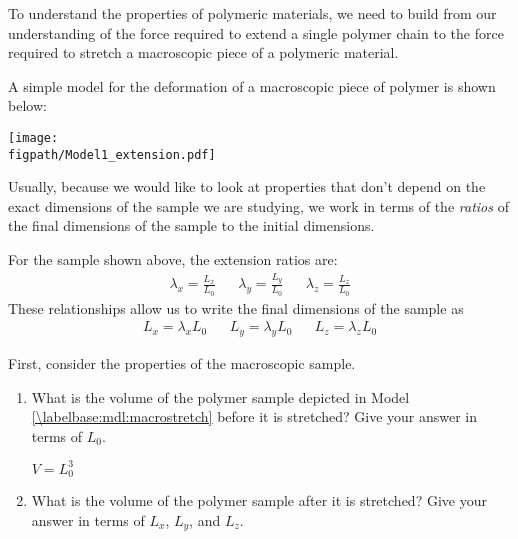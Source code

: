 \begin{activity}
\begin{instructornotes}
\end{instructornotes}


\begin{model}
	\label{\labelbase:mdl:macrostretch}

	To understand the properties of polymeric materials, we need to build from our understanding of the force required to extend a single polymer chain to the force required to stretch a macroscopic piece of a polymeric material.
	
	A simple model for the deformation of a macroscopic piece of polymer is shown below:
	
	\vspace{6pt}
	\centerline{\texttt{[image: \\figpath/Model1\_extension.pdf]}}
	
	Usually, because we would like to look at properties that don't depend on the exact dimensions of the sample we are studying, we work in terms of the \emph{ratios} of the final dimensions of the sample to the initial dimensions.
	
	For the sample shown above, the extension ratios are:
	\begin{align*}
		\lambda_x = \frac{L_x}{L_0} && \lambda_y = \frac{L_y}{L_0} && \lambda_z = \frac{L_z}{L_0}
	\end{align*}
	These relationships allow us to write the final dimensions of the sample as
	\begin{align*}
		L_x = \lambda_x L_0 && L_y = \lambda_y L_0 && L_z = \lambda_z L_0
	\end{align*}
	
\end{model}


\begin{ctqs}

	\question First, consider the properties of the macroscopic sample.
	
		\begin{enumerate}
		
			\item What is the volume of the polymer sample depicted in Model \ref{\labelbase:mdl:macrostretch} before it is stretched?  Give your answer in terms of $L_0$.
	
		\begin{solution}[0.5in]
		
			$V = L_0^3$
		\end{solution}
	
			\item What is the volume of the polymer sample after it is stretched? Give your answer in terms of $L_x$, $L_y$, and $L_z$.
	

\end{enumerate}
\end{ctqs}
\end{activity}
